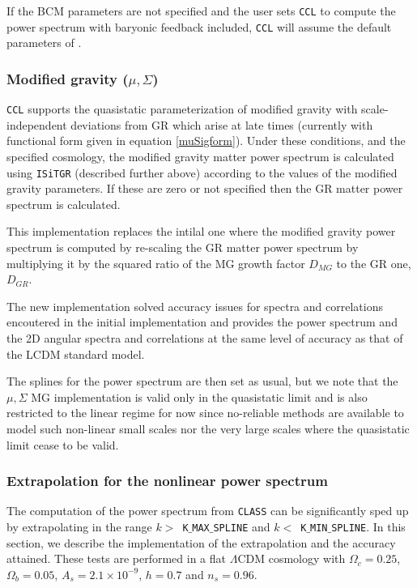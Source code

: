 \documentclass[\docopts]{\docclass}
\newcommand{\ccl}{{\tt CCL}\xspace}
\begin{document}
If the BCM parameters are not specified and the user sets \ccl to compute the power
spectrum with baryonic feedback included, \ccl will assume the default parameters
of \citet{Schneider15}.

\subsubsection{Modified gravity ($\mu, \Sigma$)}

\ccl supports the quasistatic parameterization of modified gravity with
scale-independent deviations from GR which arise at late times (currently with
functional form given in equation \ref{muSigform}). Under these conditions,
and the specified cosmology, the modified gravity matter power spectrum is
calculated using {\tt ISiTGR}  (described further above) according to the values of the modified
gravity parameters. If these are zero or not specified then the GR matter power
spectrum is calculated.

This implementation replaces the intilal one where the modified gravity power
spectrum is computed by re-scaling the GR matter power spectrum by
multiplying it by the squared ratio of the MG  growth factor $D_{MG}$ to the GR
one, $D_{GR}$.

The new implementation solved accuracy issues for spectra and  correlations
encoutered in the initial implementation and provides the power  spectrum and
the 2D angular spectra and correlations at the same level of accuracy
as that of the LCDM standard model.

The splines for the power spectrum are then set as usual, but we note that
the $\mu, \Sigma$ MG implementation is valid only in the quasistatic limit
and is also restricted to the linear regime for now since no-reliable methods
are available to model such non-linear small scales nor the very
large scales where the quasistatic limit cease to be valid.

\subsubsection{Extrapolation for the nonlinear power spectrum}
\label{sec:NLextrapol}

The computation of the power spectrum from {\tt CLASS} can be significantly sped
up by extrapolating in the range $k>$~{\tt K$\_$MAX$\_$SPLINE} and
$k<$~{\tt K$\_$MIN$\_$SPLINE}. In this section, we describe the implementation of the
extrapolation and the accuracy attained. These tests are performed in a flat
$\Lambda$CDM cosmology with $\Omega_c=0.25$, $\Omega_b=0.05$,
$A_s=2.1\times10^{-9}$, $h=0.7$ and $n_s=0.96$.
\end{document}
